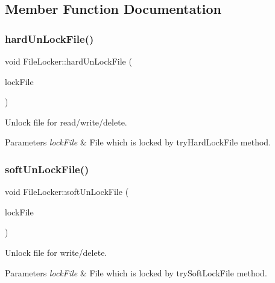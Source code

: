 \subsection{Member Function Documentation}
\mbox{\label{classFileLocker_a22ccc8e611b73bdfad46f410530c5ac9}} 
\subsubsection{\texorpdfstring{hard\+Un\+Lock\+File()}{hardUnLockFile()}}
{\footnotesize\ttfamily void File\+Locker\+::hard\+Un\+Lock\+File (\begin{DoxyParamCaption}\item[{const Q\+File\+Info \&}]{lock\+File }\end{DoxyParamCaption})\hspace{0.3cm}{\ttfamily [static]}}



Unlock file for read/write/delete. 


\begin{DoxyParams}{Parameters}
{\em lock\+File} & File which is locked by try\+Hard\+Lock\+File method. \\
\hline
\end{DoxyParams}
\mbox{\label{classFileLocker_afcffcde6a3a2a410fc981c17c63fe706}} 
\subsubsection{\texorpdfstring{soft\+Un\+Lock\+File()}{softUnLockFile()}}
{\footnotesize\ttfamily void File\+Locker\+::soft\+Un\+Lock\+File (\begin{DoxyParamCaption}\item[{const Q\+File\+Info \&}]{lock\+File }\end{DoxyParamCaption})\hspace{0.3cm}{\ttfamily [static]}}



Unlock file for write/delete. 


\begin{DoxyParams}{Parameters}
{\em lock\+File} & File which is locked by try\+Soft\+Lock\+File method. \\
\hline
\end{DoxyParams}
\mbox{\label{classFileLocker_ad8380762c767d038ec02d936bf974180}} 
